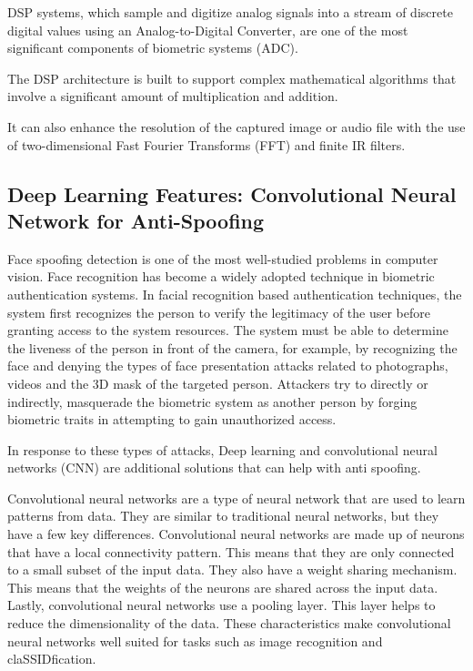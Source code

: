 \documentclass[11pt]{article}
\begin{document}
DSP systems, which sample and digitize analog signals into a stream of discrete digital values using an Analog-to-Digital Converter, are one of the most significant components of biometric systems (ADC).


The DSP architecture is built to support complex mathematical algorithms that involve a significant amount of multiplication and addition.


It can also enhance the resolution of the captured image or audio file with the use of two-dimensional Fast Fourier Transforms (FFT) and finite IR filters.


\subsection{Deep Learning Features: Convolutional Neural Network for Anti-Spoofing}

Face spoofing detection is one of the most well-studied problems in computer vision. Face recognition has become a widely adopted technique in biometric authentication systems. In facial recognition based authentication techniques, the system first recognizes the person to verify the legitimacy of the user before granting access to the system resources. The system must be able to determine the liveness of the person in front of the camera, for example, by recognizing the face and denying the types of face presentation attacks related to photographs, videos and the 3D mask of the targeted person. Attackers try to directly or indirectly, masquerade the biometric system as another person by forging biometric traits in attempting to gain unauthorized access.


In response to these types of attacks, Deep learning and convolutional neural networks (CNN) are additional solutions that can help with anti spoofing.


Convolutional neural networks are a type of neural network that are used to learn patterns from data. They are similar to traditional neural networks, but they have a few key differences. Convolutional neural networks are made up of neurons that have a local connectivity pattern. This means that they are only connected to a small subset of the input data. They also have a weight sharing mechanism. This means that the weights of the neurons are shared across the input data. Lastly, convolutional neural networks use a pooling layer. This layer helps to reduce the dimensionality of the data. These characteristics make convolutional neural networks well suited for tasks such as image recognition and claSSIDfication.
\end{document}
